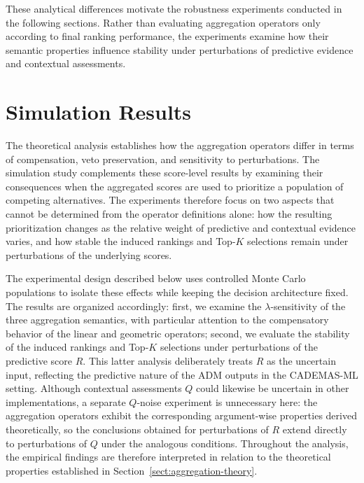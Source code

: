 \documentclass[mathematics,article,submit,moreauthors]{Definitions/mdpi}
\begin{document}
These analytical differences motivate the robustness experiments
conducted in the following sections. Rather than evaluating aggregation
operators only according to final ranking performance, {\color{teal}the
experiments examine how} their semantic properties influence stability
under perturbations of predictive evidence and contextual assessments.



\section{Simulation Results}
\label{sect:simulation}

The theoretical analysis establishes how the aggregation operators differ in
terms of compensation, veto preservation, and sensitivity to perturbations.
The simulation study complements these score-level results by examining their
consequences when the aggregated scores are used to prioritize a population of
competing alternatives. The experiments therefore focus on two aspects that
cannot be determined from the operator definitions alone: how the resulting
prioritization changes as the relative weight of predictive and contextual
evidence varies, and how stable the induced rankings and Top-$K$ selections
remain under perturbations of the underlying scores.

The experimental design described below uses controlled Monte Carlo
populations to isolate these effects while keeping the decision architecture
fixed. The results are organized accordingly: first, we examine the
$\lambda$-sensitivity of the three aggregation semantics, with particular
attention to the compensatory behavior of the linear and geometric operators;
second, we evaluate the stability of the induced rankings and Top-$K$
selections under perturbations of the predictive score $R$. This latter
analysis deliberately treats $R$ as the uncertain input, reflecting the
predictive nature of the ADM outputs in the CADEMAS-ML setting. Although
contextual assessments $Q$ could likewise be uncertain in other
implementations, a separate $Q$-noise experiment is unnecessary here: the
aggregation operators exhibit the corresponding argument-wise properties
derived theoretically, so the conclusions obtained for perturbations of $R$
extend directly to perturbations of $Q$ under the analogous conditions.
Throughout the analysis, the empirical findings are therefore interpreted in
relation to the theoretical properties established in
Section~\ref{sect:aggregation-theory}.
\end{document}
